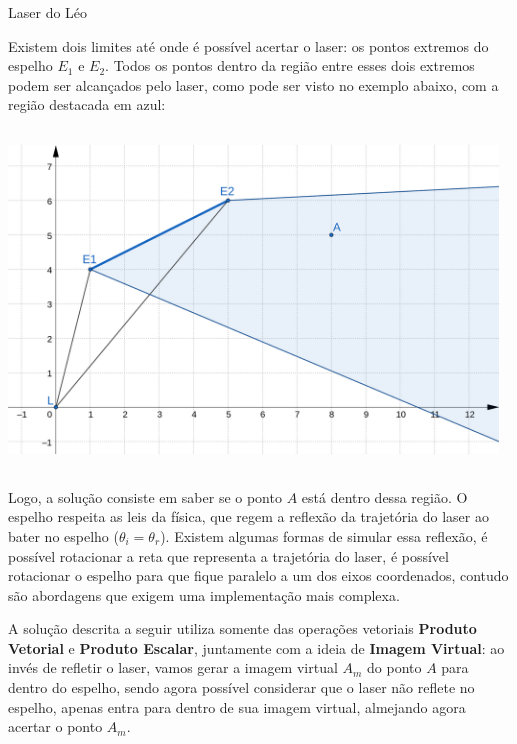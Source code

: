 \begin{tutorial}{Laser do Léo}

\providecommand{\url}[1]{\underline{\texttt{#1}}}

Existem dois limites até onde é possível acertar o laser: os pontos extremos do espelho $E_1$ e $E_2$. Todos os pontos dentro da região entre esses dois extremos podem ser alcançados pelo laser, como pode ser visto no exemplo abaixo, com a região destacada em azul:

\begin{center}
\includegraphics[width=13cm, height=9cm]{tutorial1.png}
\end{center}

Logo, a solução consiste em saber se o ponto $A$ está dentro dessa região. O espelho respeita as leis da física, que regem a reflexão da trajetória do laser ao bater no espelho ($\theta_i = \theta_r$). Existem algumas formas de simular essa reflexão, é possível rotacionar a reta que representa a trajetória do laser, é possível rotacionar o espelho para que fique paralelo a um dos eixos coordenados, contudo são abordagens que exigem uma implementação mais complexa.

A solução descrita a seguir utiliza somente das operações vetoriais \textbf{Produto Vetorial} e \textbf{Produto Escalar}, juntamente com a ideia de \textbf{Imagem Virtual}: ao invés de refletir o laser, vamos gerar a imagem virtual $A_m$ do ponto $A$ para dentro do espelho, sendo agora possível considerar que o laser não reflete no espelho, apenas entra para dentro de sua imagem virtual, almejando agora acertar o ponto $A_m$.


\end{tutorial}
